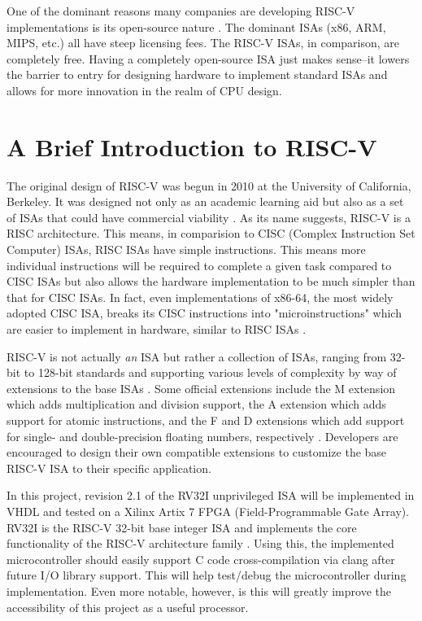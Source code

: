 \documentclass[lettersize,journal]{IEEEtran}
\begin{document}
One of the dominant reasons many companies are developing RISC-V implementations is its open-source nature \cite{riscvhistory}. 
The dominant ISAs (x86, ARM, MIPS, etc.) all have steep licensing fees.
The RISC-V ISAs, in comparison, are completely free. 
Having a completely open-source ISA just makes sense--it lowers the barrier to entry for designing hardware to implement standard 
ISAs and allows for more innovation in the realm of CPU design.  

\section{A Brief Introduction to RISC-V}
The original design of RISC-V was begun in 2010 at the University of California, Berkeley. 
It was designed not only as an academic learning aid but also as a set of ISAs that could have commercial viability \cite{riscvhistory}. 
As its name suggests, RISC-V is a RISC architecture. 
This means, in comparision to CISC (Complex Instruction Set Computer) ISAs, RISC ISAs have simple instructions. 
This means more individual instructions will be required to complete a given task compared to CISC ISAs but also allows the 
hardware implementation to be much simpler than that for CISC ISAs.
In fact, even implementations of x86-64, the most widely adopted CISC ISA, breaks its CISC instructions into "microinstructions" which are easier to implement in hardware, similar to RISC ISAs \cite{cisctorisc}.

RISC-V is not actually \textit{an} ISA but rather a collection of ISAs, 
ranging from 32-bit to 128-bit standards and supporting various levels of complexity by way of extensions to the base ISAs \cite{riscvunprovisioned}. 
Some official extensions include the M extension which adds multiplication and division support, 
the A extension which adds support for atomic instructions, and the F and D extensions which add support for single- and double-precision floating numbers, 
respectively \cite{riscvunprovisioned}. Developers are encouraged to design their own compatible extensions to customize the base RISC-V ISA to their specific application.

In this project, revision 2.1 of the RV32I unprivileged ISA will be implemented in VHDL and tested on a Xilinx Artix 7 FPGA (Field-Programmable Gate Array). 
RV32I is the RISC-V 32-bit base integer ISA and implements the core functionality of the RISC-V architecture family \cite{riscvunprovisioned}.
Using this, the implemented microcontroller should easily support C code cross-compilation via clang after future I/O library support.
This will help test/debug the microcontroller during implementation.
Even more notable, however, is this will greatly improve the accessibility of this project as a useful processor.
\end{document}
